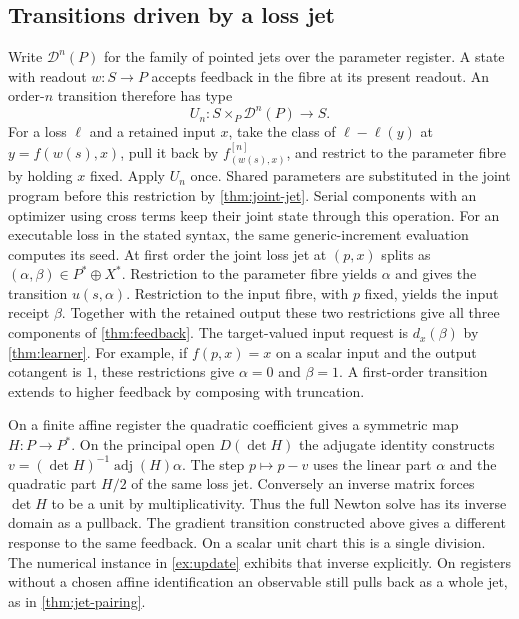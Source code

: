\documentclass[11pt,a4paper]{article}
\theoremstyle{definition}
\theoremstyle{remark}\newaliascnt{remark}{theorem}
\numberwithin{equation}{section}
\begin{document}
\subsection{Transitions driven by a loss jet}
Write $\mathcal D^n(P)$ for the family of pointed jets over the parameter register. A state with readout $w:S\to P$ accepts feedback in the fibre at its present readout. An order-$n$ transition therefore has type
\[
              U_n:S\times_P\mathcal D^n(P)\longrightarrow S .
\]
For a loss $\ell$ and a retained input $x$, take the class of $\ell-\ell(y)$ at $y=f(w(s),x)$, pull it back by $f^{[n]}_{(w(s),x)}$, and restrict to the parameter fibre by holding $x$ fixed. Apply $U_n$ once. Shared parameters are substituted in the joint program before this restriction by \cref{thm:joint-jet}. Serial components with an optimizer using cross terms keep their joint state through this operation. For an executable loss in the stated syntax, the same generic-increment evaluation computes its seed. At first order the joint loss jet at $(p,x)$ splits as $(\alpha,\beta)\in P^*\oplus X^*$. Restriction to the parameter fibre yields $\alpha$ and gives the transition $u(s,\alpha)$. Restriction to the input fibre, with $p$ fixed, yields the input receipt $\beta$. Together with the retained output these two restrictions give all three components of \cref{thm:feedback}. The target-valued input request is $d_x(\beta)$ by \cref{thm:learner}. For example, if $f(p,x)=x$ on a scalar input and the output cotangent is $1$, these restrictions give $\alpha=0$ and $\beta=1$. A first-order transition extends to higher feedback by composing with truncation.

On a finite affine register the quadratic coefficient gives a symmetric map $H:P\to P^*$. On the principal open $D(\det H)$ the adjugate identity constructs $v=(\det H)^{-1}\operatorname{adj}(H)\alpha$. The step $p\mapsto p-v$ uses the linear part $\alpha$ and the quadratic part $H/2$ of the same loss jet. Conversely an inverse matrix forces $\det H$ to be a unit by multiplicativity. Thus the full Newton solve has its inverse domain as a pullback. The gradient transition constructed above gives a different response to the same feedback. On a scalar unit chart this is a single division. The numerical instance in \cref{ex:update} exhibits that inverse explicitly. On registers without a chosen affine identification an observable still pulls back as a whole jet, as in \cref{thm:jet-pairing}.
\end{document}
